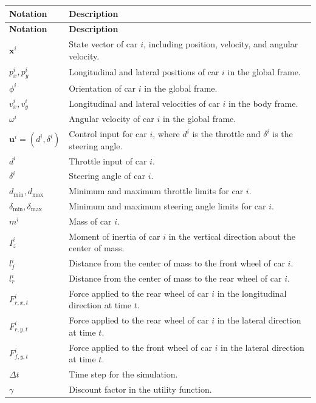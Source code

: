 \begin{longtable}{|l|l|}
\hline
\textbf{Notation} & \textbf{Description} \\
\hline
\endfirsthead
\hline
\textbf{Notation} & \textbf{Description} \\
\hline
\endhead
\hline
\endfoot
\hline
\endlastfoot

\(\mathbf{x}^i\) & State vector of car \(i\), including position, velocity, and angular velocity. \\
\(p_x^i, p_y^i\) & Longitudinal and lateral positions of car \(i\) in the global frame. \\
\(\phi^i\) & Orientation of car \(i\) in the global frame. \\
\(v_x^i, v_y^i\) & Longitudinal and lateral velocities of car \(i\) in the body frame. \\
\(\omega^i\) & Angular velocity of car \(i\) in the global frame. \\
\(\mathbf{u}^i = (d^i, \delta^i)\) & Control input for car \(i\), where \(d^i\) is the throttle and \(\delta^i\) is the steering angle. \\
\(d^i\) & Throttle input of car \(i\). \\
\(\delta^i\) & Steering angle of car \(i\). \\
\(d_{\min}, d_{\max}\) & Minimum and maximum throttle limits for car \(i\). \\
\(\delta_{\min}, \delta_{\max}\) & Minimum and maximum steering angle limits for car \(i\). \\
\(m^i\) & Mass of car \(i\). \\
\(I_z^i\) & Moment of inertia of car \(i\) in the vertical direction about the center of mass. \\
\(l_f^i\) & Distance from the center of mass to the front wheel of car \(i\). \\
\(l_r^i\) & Distance from the center of mass to the rear wheel of car \(i\). \\
\(F_{r,x,t}^i\) & Force applied to the rear wheel of car \(i\) in the longitudinal direction at time \(t\). \\
\(F_{r,y,t}^i\) & Force applied to the rear wheel of car \(i\) in the lateral direction at time \(t\). \\
\(F_{f,y,t}^i\) & Force applied to the front wheel of car \(i\) in the lateral direction at time \(t\). \\
\(\Delta t\) & Time step for the simulation. \\
\(\gamma\) & Discount factor in the utility function. \\

\end{longtable}
